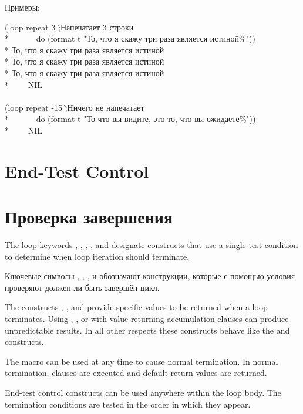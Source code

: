 \begin{defloop}
Примеры:
\begin{lisp}
(loop repeat 3 \`;\textrm{Напечатает 3 строки}\\*
~~~~~~do (format t "То, что я скажу три раза является истиной{\Xtilde}\%")) \\*
То, что я скажу три раза является истиной \\*
То, что я скажу три раза является истиной \\*
То, что я скажу три раза является истиной \\*
~~~\EV~NIL \\
 \\
(loop repeat -15 \`;\textrm{Ничего не напечатает}\\*
~~~~~~do (format t "То что вы видите, это то, что вы ожидаете{\Xtilde}\%")) \\*
~~~\EV~NIL
\end{lisp}
\end{defloop}


\section{End-Test Control}
\label{LOOP-TEST-SECTION}

\section{Проверка завершения}
\label{LOOP-TEST-SECTION}

The loop keywords , , ,
, and  designate constructs that use a single test 
condition to determine when loop iteration should terminate.

Ключевые символы , , , 
и  обозначают конструкции, которые с помощью условия
проверяют должен ли быть завершён цикл.

The constructs , , and  provide
specific values to be returned when a loop terminates.  
Using , , or  with 
value-returning accumulation clauses can produce unpredictable results.
In all other respects these
constructs behave like the  and  constructs.

The macro  can be used at any time to cause normal
termination.  In normal termination,  clauses are 
executed and default return values are returned.

End-test control constructs can be used anywhere within the loop
body.  The termination conditions are tested in the order in which
they appear.

